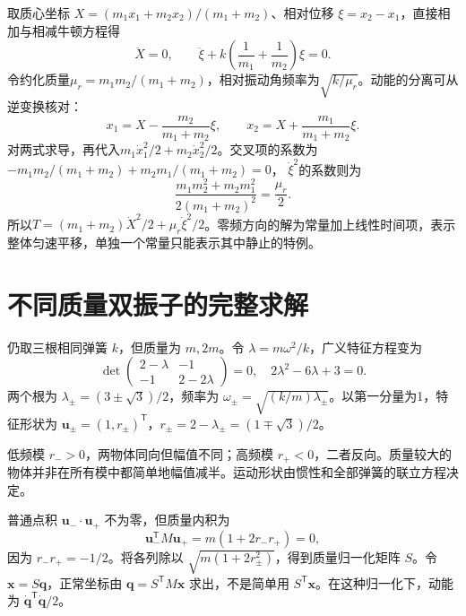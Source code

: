 \documentclass[11pt,openany,fontset=fandol]{ctexbook}
\theoremstyle{plain}\newtheorem{theorem}{定理}[chapter]\newtheorem{proposition}[theorem]{命题}
\theoremstyle{definition}\newtheorem{definition}{定义}[chapter]\newtheorem{example}{例}[chapter]
\theoremstyle{remark}\newtheorem*{remark}{说明}
\newcommand{\vct}[1]{\bm{#1}}\newcommand{\Rea}{\operatorname{Re}}\newcommand{\Ima}{\operatorname{Im}}
\begin{document}
取质心坐标 $X=(m_1x_1+m_2x_2)/(m_1+m_2)$、相对位移 $\xi=x_2-x_1$，直接相加与相减牛顿方程得
\begin{equation}
\ddot X=0,\qquad \ddot\xi+k\left(\frac1{m_1}+\frac1{m_2}\right)\xi=0.
\end{equation}
令约化质量$\mu_r=m_1m_2/(m_1+m_2)$，相对振动角频率为$\sqrt{k/\mu_r}$。动能的分离可从逆变换核对：
\[
x_1=X-\frac{m_2}{m_1+m_2}\xi,\qquad
x_2=X+\frac{m_1}{m_1+m_2}\xi.
\]
对两式求导，再代入$m_1\dot x_1^2/2+m_2\dot x_2^2/2$。交叉项的系数为
$-m_1m_2/(m_1+m_2)+m_2m_1/(m_1+m_2)=0$，
$\dot\xi^2$的系数则为
\[
\frac{m_1m_2^2+m_2m_1^2}{2(m_1+m_2)^2}
=\frac{\mu_r}{2}.
\]
所以$T=(m_1+m_2)\dot X^2/2+\mu_r\dot\xi^2/2$。零频方向的解为常量加上线性时间项，表示整体匀速平移，单独一个常量只能表示其中静止的特例。

\section{不同质量双振子的完整求解}
仍取三根相同弹簧 $k$，但质量为 $m,2m$。令 $\lambda=m\omega^2/k$，广义特征方程变为
\[
\det\begin{pmatrix}2-\lambda&-1\\-1&2-2\lambda\end{pmatrix}=0,
\quad 2\lambda^2-6\lambda+3=0.
\]
两个根为 $\lambda_\pm=(3\pm\sqrt3)/2$，频率为 $\omega_\pm=\sqrt{(k/m)\lambda_\pm}$。以第一分量为1，特征形状为 $\vct u_\pm=(1,r_\pm)^{\mathsf T}$，$r_\pm=2-\lambda_\pm=(1\mp\sqrt3)/2$。

低频模 $r_->0$，两物体同向但幅值不同；高频模 $r_+<0$，二者反向。质量较大的物体并非在所有模中都简单地幅值减半。运动形状由惯性和全部弹簧的联立方程决定。

普通点积 $\vct u_-\cdot\vct u_+$ 不为零，但质量内积为
\[
\vct u_-^{\mathsf T}M\vct u_+=m(1+2r_-r_+)=0,
\]
因为 $r_-r_+=-1/2$。将各列除以 $\sqrt{m(1+2r_\pm^2)}$，得到质量归一化矩阵 $S$。令 $\vct x=S\vct q$，正常坐标由 $\vct q=S^{\mathsf T}M\vct x$ 求出，不是简单用 $S^{\mathsf T}\vct x$。在这种归一化下，动能为 $\dot{\vct q}^{\mathsf T}\dot{\vct q}/2$。
\end{document}
